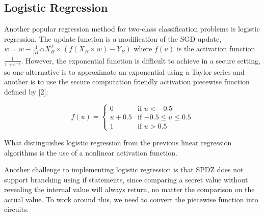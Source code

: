 \documentclass{article}
\makeatletter
\theoremstyle{plain}
\theoremstyle{definition}
\theoremstyle{remark}
\def\BState{\State\hskip-\ALG@thistlm}
\makeatother
\begin{document}
\subsection{Logistic Regression}

Another popular regression method for two-class classification problems is logistic regression. The update function is a modification of the SGD update, $ w = w - \frac{1}{|B|} \alpha X^{T}_{B} \times (f(X_{B} \times w) - Y_{B})$ where $f(u)$ is the activation function $\frac{1}{1+e^{-u}}$. However, the exponential function is difficult to achieve in a secure setting, so one alternative is to approximate an exponential using a Taylor series and another is to use the secure computation friendly activation piecewise function defined by [2]: 

\[
  f(u) =
  \begin{cases}
                                   0 & \text{if $u < -0.5$} \\
                                   u + 0.5 & \text{if $-0.5 \leq u \leq 0.5$} \\
1 & \text{if $u > 0.5$}
  \end{cases}
\]


What distinguishes logistic regression from the previous linear regression algorithms is the use of a nonlinear activation function. 

\begin{algorithm}[H]
\caption{}\label{euclid}
\end{algorithm}

Another challenge to implementing logistic regression is that SPDZ does not support branching using if statements, since comparing a secret value without revealing the internal value will always return, no matter the comparison on the actual value. To work around this, we need to convert the piecewise function into circuits.
\end{document}
